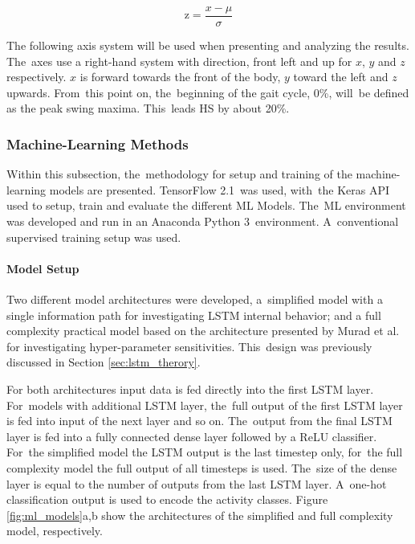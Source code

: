 \begin{equation}
    \text{z} = \frac{x-\mu}{\sigma}
    \label{eqn:z_score}
\end{equation}

The following axis system will be used when presenting and analyzing the results. The~axes use a right-hand system with direction, front left and up for $x$, $y$ and $z$ respectively. $x$ is forward towards the front of the body, $y$ toward the left and $z$ upwards. From~this point on, the~beginning of the gait cycle, 0\%, will~be defined as the peak swing maxima. This~leads HS by about 20\%. 


\subsubsection{Machine-Learning Methods}
\label{sec:machine_Learning}
Within this subsection, the~methodology for setup and training of the machine-learning models are presented. TensorFlow 2.1~was used, with~the Keras API used to setup, train and evaluate the different ML Models. The~ML environment was developed and run in an Anaconda Python 3~environment. A~conventional supervised training setup was used.

\paragraph{Model Setup}
\label{subsubsec:model_setup}
Two different model architectures were developed, a~simplified model with a single information path for investigating LSTM internal behavior; and a full complexity practical model based on the architecture presented by Murad et al.~\cite{Murad2017} for investigating hyper-parameter sensitivities. This~design was previously discussed in Section \ref{sec:lstm_therory}.

For both architectures input data is fed directly into the first LSTM layer. For~models with additional LSTM layer, the~full output of the first LSTM layer is fed into input of the next layer and so on. The~output from the final LSTM layer is fed into a fully connected dense layer followed by a ReLU classifier. For~the simplified model the LSTM output is the last timestep only, for~the full complexity model the full output of all timesteps is used. The~size of the dense layer is equal to the number of outputs from the last LSTM layer. A~one-hot classification output is used to encode the activity classes. Figure  \ref{fig:ml_models}a,b show the architectures of the simplified and full complexity model, respectively.



